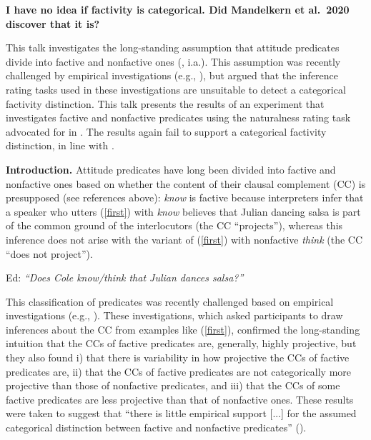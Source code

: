 \documentclass[12pt,fleqn]{article}
\newcommand{\6}{\mbox{$[\hspace*{-.6mm}[$}}
\newcommand{\9}{\mbox{$]\hspace*{-.6mm}]$}}
\begin{document}

\begin{center}
{\bf I have no idea if factivity is categorical. Did Mandelkern et al.\ 2020 discover that it is?}
\end{center}

\vspace*{-.5cm}

\noindent
This talk investigates the long-standing assumption that attitude predicates divide into factive and nonfactive ones (\citealt{kiparsky-kiparsky70,karttunen71b,heim92}, i.a.). This assumption was recently challenged by empirical investigations (e.g., \citealt*{demarneffe-etal-sub23,degen-tonhauser-language}), but \citealt*{mandelkern-etal2020} argued that the inference rating tasks used in these investigations are unsuitable to detect a categorical factivity distinction. This talk presents the results of an experiment that investigates factive and nonfactive predicates using the naturalness rating task advocated for in \citealt{mandelkern-etal2020}. The results again fail to support  a categorical factivity distinction, in line with \citealt{degen-tonhauser-language}.

\noindent
{\bf Introduction.} Attitude predicates have long been divided into factive and nonfactive ones based on whether the content of their clausal complement (CC) is presupposed (see references above): {\em know} is factive because interpreters infer that a speaker who utters (\ref{first}) with {\em know} believes that Julian dancing salsa is part of the common ground of the interlocutors (the CC ``projects''), whereas this inference does not arise with the variant of (\ref{first}) with nonfactive {\em think} (the CC ``does not project'').

\vspace*{-.2cm}
\begin{exe}
\ex\label{first} Ed: {\em ``Does Cole know/think that Julian dances salsa?''}
\end{exe}
\vspace*{-.2cm}

This classification of predicates was recently challenged based on empirical investigations (e.g., \citealt{demarneffe-etal-sub23,degen-tonhauser-language}). These investigations, which asked participants to draw inferences about the CC from examples like (\ref{first}), confirmed the long-standing intuition that the CCs of factive predicates are, generally, highly projective, but they also found i) that there is variability in how projective the CCs of factive predicates are, ii) that the CCs of factive predicates are not categorically more projective than those of nonfactive predicates, and iii) that the CCs of some factive predicates are less projective than that of nonfactive ones. These results were taken to suggest that ``there is little empirical support [...] for the assumed categorical distinction between factive and nonfactive predicates'' (\citealt[552]{degen-tonhauser-language}).
\end{document}

